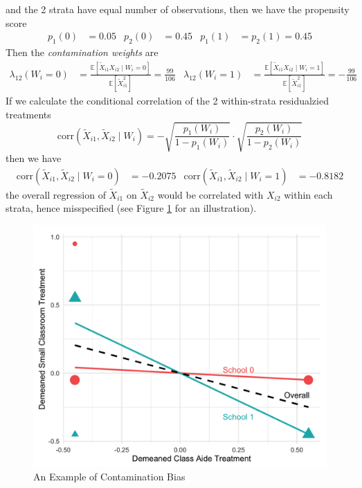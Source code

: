 \documentclass[twoside]{article}
\begin{document}
and the 2 strata have equal number of observations, then we have the propensity score
\begin{align*}
    p_1(0)&=0.05 & p_2(0)&=0.45 & p_1(1)&=p_2(1)=0.45
\end{align*}
Then the \textit{contamination weights} are
\begin{align*}
    \lambda_{12}(W_i=0) &= \frac{\mathbb{E}\left[\tilde{X}_{i1}X_{i2}\mid W_i=0\right]}{\mathbb{E}\left[\tilde{X}^2_{i1}\right]} = \frac{99}{106} & \lambda_{12}(W_i=1) &= \frac{\mathbb{E}\left[\tilde{X}_{i1}X_{i2}\mid W_i=1\right]}{\mathbb{E}\left[\tilde{X}^2_{i1}\right]} = -\frac{99}{106}
\end{align*}
If we calculate the conditional correlation of the 2 within-strata residualzied treatments
\begin{equation*}
    \mathrm{corr}\left(\tilde{X}_{i1},\tilde{X}_{i2}\mid W_i\right) = -\sqrt{\frac{p_1(W_i)}{1-p_1(W_i)}} \cdot \sqrt{\frac{p_2(W_i)}{1-p_2(W_i)}}
\end{equation*}
then we have 
\begin{align*}
    \mathrm{corr}\left( \tilde{X}_{i1},\tilde{X}_{i2} \mid W_i=0 \right) &= -0.2075 & \mathrm{corr}\left( \tilde{X}_{i1},\tilde{X}_{i2} \mid W_i=1 \right)&=-0.8182
\end{align*}
the overall regression of $\tilde{X}_{i1}$ on $\tilde{X}_{i2}$ would be correlated with $X_{i2}$ within each strata, hence misspecified (see Figure \ref{fig:misspecify_example} for an illustration).
\begin{figure}[ht]
    \centering
    \includegraphics[width = 0.6 \textwidth]{figures/example_misspecify.png}
    \caption{An Example of Contamination Bias \citep[Figure 1]{goldsmith2022contamination}}\label{fig:misspecify_example}
\end{figure}
\end{document}
